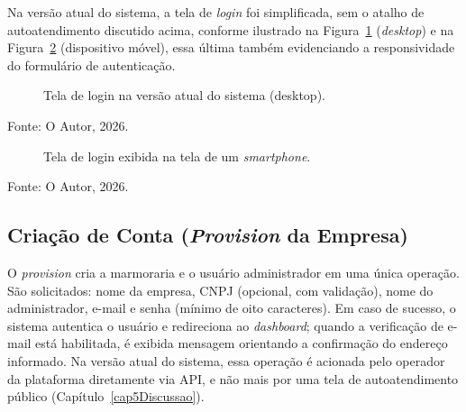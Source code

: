 Na versão atual do sistema, a tela de \textit{login} foi simplificada, sem o atalho de autoatendimento discutido acima, conforme ilustrado na Figura~\ref{fig:login-atual} (\textit{desktop}) e na Figura~\ref{fig:login-mobile} (dispositivo móvel), essa última também evidenciando a responsividade do formulário de autenticação.

\begin{figure}[H]
  \centering
  \captionsetup{justification=centering}
  \caption{Tela de login na versão atual do sistema (desktop).}
  \label{fig:login-atual}
\end{figure}
{\centering\small Fonte: O Autor, 2026.\par}
\vspace{0.8em}

\begin{figure}[H]
  \centering
  \captionsetup{justification=centering}
  \caption{Tela de login exibida na tela de um \textit{smartphone}.}
  \label{fig:login-mobile}
\end{figure}
{\centering\small Fonte: O Autor, 2026.\par}
\vspace{0.8em}

\subsection{Criação de Conta (\textit{Provision} da Empresa)}

O \textit{provision} cria a marmoraria e o usuário administrador em uma única operação. São solicitados: nome da empresa, CNPJ (opcional, com validação), nome do administrador, e-mail e senha (mínimo de oito caracteres). Em caso de sucesso, o sistema autentica o usuário e redireciona ao \textit{dashboard}; quando a verificação de e-mail está habilitada, é exibida mensagem orientando a confirmação do endereço informado. Na versão atual do sistema, essa operação é acionada pelo operador da plataforma diretamente via API, e não mais por uma tela de autoatendimento público (Capítulo~\ref{cap5Discussao}).

